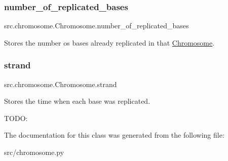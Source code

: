 \subsubsection{\texorpdfstring{number\+\_\+of\+\_\+replicated\+\_\+bases}{number\_of\_replicated\_bases}}
{\footnotesize\ttfamily src.\+chromosome.\+Chromosome.\+number\+\_\+of\+\_\+replicated\+\_\+bases}



Stores the number os bases already replicated in that \mbox{\hyperlink{classsrc_1_1chromosome_1_1Chromosome}{Chromosome}}. 

\mbox{\label{classsrc_1_1chromosome_1_1Chromosome_a0a465339e3b71993e96bd29898511028}} 
\subsubsection{\texorpdfstring{strand}{strand}}
{\footnotesize\ttfamily src.\+chromosome.\+Chromosome.\+strand}



Stores the time when each base was replicated. 

T\+O\+DO\+: 

The documentation for this class was generated from the following file\+:\begin{DoxyCompactItemize}
\item 
src/chromosome.\+py\end{DoxyCompactItemize}
